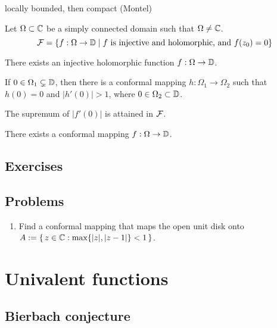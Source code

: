 \documentclass{../../large}
\begin{document}
\begin{prb}
locally bounded, then compact (Montel)
\end{prb}

\begin{prb}
\end{prb}

\begin{prb}
Let $\Omega\subset\mathbb{C}$ be a simply connected domain such that $\Omega\ne\mathbb{C}$.
\[\mathcal{F}=\{f:\Omega\to\mathbb{D}\mid f\text{ is injective and holomorphic, and }f(z_0)=0\}\]
\begin{parts}
\item There exists an injective holomorphic function $f:\Omega\to\mathbb{D}$.
\item If $0\in\Omega_1\subsetneq\mathbb{D}$, then there is a conformal mapping $h:\Omega_1\to\Omega_2$ such that $h(0)=0$ and $|h'(0)|>1$, where $0\in\Omega_2\subset\mathbb{D}$.
\item The supremum of $|f'(0)|$ is attained in $\mathcal{F}$.
\item There exists a conformal mapping $f:\Omega\to\mathbb{D}$.
\end{parts}
\end{prb}


\section*{Exercises}
\begin{prb}
\end{prb}
\begin{prb}
\end{prb}

\section*{Problems}
\begin{enumerate}
\item Find a conformal mapping that maps the open unit disk onto $A:=\{\,z\in\mathbb{C}:\max\{|z|,|z-1|\}<1\,\}$.
\end{enumerate}




\chapter{Univalent functions}
\section{Bierbach conjecture}
\end{document}
